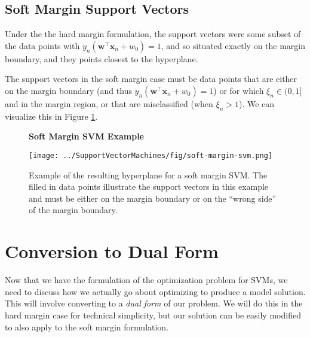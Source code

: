 
\subsection{Soft Margin Support Vectors}
Under the the hard margin formulation, the support vectors were some subset of the  data points with $y_{n}(\textbf{w}^\top\textbf{x}_{n} + w_{0})=1$,
and so situated exactly on the margin boundary,  and  they points
closest to the hyperplane.

The support vectors in the soft margin case must be data points that are either  on the margin boundary (and thus $y_{n}(\textbf{w}^\top\textbf{x}_{n} + w_{0})=1$) or for which $\xi_n\in (0,1]$ and in the margin region, or that are misclassified (when $\xi_{n} > 1$). We can visualize this in Figure \ref{fig:soft-margin-svm}.


%
\begin{figure}
    \centering
    \textbf{Soft Margin SVM Example}\par\medskip
    \texttt{[image: ../SupportVectorMachines/fig/soft-margin-svm.png]}
    \caption{Example of the resulting hyperplane for a soft margin SVM. The filled in data points illustrate the support vectors in this example and must be either on the margin boundary or on the ``wrong side'' of the margin boundary.}
    \label{fig:soft-margin-svm}
\end{figure}

\section{Conversion to Dual Form}

Now that we have the formulation of the optimization problem for SVMs, we need to discuss how we actually go about optimizing to produce a model solution. This will involve converting to a \textit{dual form} of our problem. We will do this in the hard margin case for technical simplicity, but our solution can be easily modified to also  apply to the soft margin formulation.

